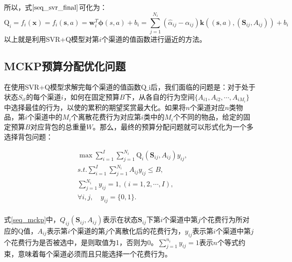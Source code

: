 所以，式$\eqref{seq_svr_final}$可化为：
\begin{equation}\label{seq_final}
\text{Q}_{i}=f_{i}(\bm{x})=f_{i}(\bm{s},a)=\bm{w}_{i}^{T} \bm{\phi}(s,a) + b_{i}=\sum_{j=1}^{N_{i}}(\hat{\alpha}_{ij}-\alpha_{ij})\bm{k}((\bm{s},a),(\bm{S}_{ij},A_{ij}))+b_{i}
\end{equation}
以上就是利用SVR+Q模型对第$i$个渠道的值函数进行逼近的方法。

\subsection{MCKP预算分配优化问题}
在使用SVR+Q模型求解完每个渠道的值函数$\text{Q_{i}}$后，我们面临的问题是：对于处于状态$S_{it}$的每个渠道$i$，如何在固定预算$B$下，从各自的行为空间$\{A_{i1},A_{i2},\cdots,A_{iM_{i}}\}$中选择最佳的行为，以使的累积的期望奖赏最大化。如果将$n$个渠道对应$n$类物品，第$i$个渠道中的$M_{i}$个离散花费行为对应第$i$类中的$M_{i}$个不同的物品，给定的固定预算$B$对应背包的总重量$W$。那么，最终的预算分配问题就可以形式化为一个多选择背包问题：

\begin{equation}\label{seq_mckp}
\begin{split}
&\max \sum_{i=1}^{I}\sum_{j=1}^{N_{i}}\text{Q}_{i}(\bm{S}_{ij}, A_{ij})y_{ij},\\
&s.t. \sum_{i=1}^{I}\sum_{j=1}^{N_{i}}A_{ij}y_{ij} \leqslant B,\\
&\sum_{j=1}^{N_{i}}y_{ij}=1, (i=1,2,\cdots,I),\\
&\forall i,j, \quad y_{ij}=\{0,1\}.\\
\end{split}
\end{equation}

式\eqref{seq_mckp}中，$Q_{ij}(\bm{S}_{ij}, A_{ij})$表示在状态$\bm{S}_{ij}$下第$i$个渠道中第$j$个花费行为所对应的Q值，$A_{ij}$表示第$i$个渠道的第$j$个离散化后的花费行为，$y_{ij}$表示第$i$个渠道中第$j$个花费行为是否被选中，是则取值为1，否则为0。$\sum_{j=1}^{n_{i}}y_{ij}=1$表示$n$个等式约束，意味着每个渠道必须而且只能选择一个花费行为。

